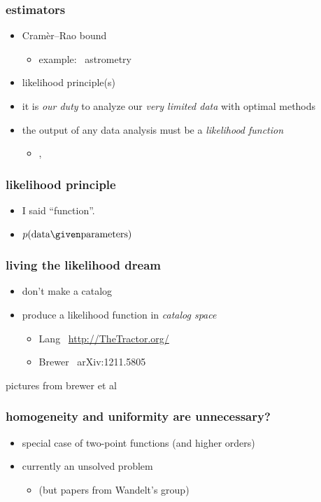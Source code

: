 \documentclass[pdftex]{beamer}
\newcommand{\data}{\mbox{data}}
\newcommand{\pars}{\mbox{parameters}}
\begin{document}
\begin{frame}
  \frametitle{estimators}
  \begin{itemize}
  \item Cram\`er--Rao bound
    \begin{itemize}
    \item example: \gaia\ astrometry
    \end{itemize}
  \item likelihood principle(s)
  \item it is \emph{our duty} to analyze our \emph{very limited data} with optimal methods
  \item the output of any data analysis must be a \emph{likelihood function}
    \begin{itemize}
    \item {}, 
    \end{itemize}
  \end{itemize}
\end{frame}

\begin{frame}
  \frametitle{likelihood principle}
  \begin{itemize}
  \item I said ``function''.
  \item $p(\data\given\pars)$
  \end{itemize}
\end{frame}

\begin{frame}
  \frametitle{living the likelihood dream}
  \begin{itemize}
  \item don't make a catalog
  \item produce a likelihood function in \emph{catalog space}
    \begin{itemize}
    \item Lang \etal\ \url{http://TheTractor.org/}
    \item Brewer \etal\ arXiv:1211.5805
    \end{itemize}
  \end{itemize}
\end{frame}

\begin{frame}
pictures from brewer et al
\end{frame}

\begin{frame}
  \frametitle{homogeneity and uniformity are unnecessary?}
  \begin{itemize}
  \item special case of two-point functions (and higher orders)
  \item currently an unsolved problem
    \begin{itemize}
    \item (but papers from Wandelt's group)
    \end{itemize}
  \end{itemize}
\end{frame}
\end{document}
